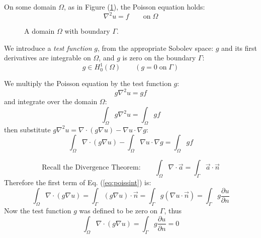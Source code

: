 \documentclass[12pt, a4paper, twoside, openright]{book}
\begin{document}
\vspace{2em}

On some domain $\Omega$, as in Figure (\ref{domain}), the Poisson equation holds:
\begin{equation}
\nabla^2 u = f \qquad \text{on} \; \Omega
\end{equation}

\vspace{1em}
\begin{figure}[ht]
\centering
{}
\caption{A domain $\Omega$ with boundary $\Gamma$.}\label{domain}
\end{figure}

\clearpage
We introduce a \emph{test function} $g$, from the appropriate Sobolev space:  $g$ and its first derivatives are integrable on $\Omega$, and $g$ is zero on the boundary $\Gamma$:
\begin{equation}
g \in H_0^1(\Omega) \qquad (g=0 \; \text{on} \; \Gamma)
\end{equation}

We multiply the Poisson equation by the test function $g$:
\begin{equation}
g \nabla^2 u = g f
\end{equation}
and integrate over the domain $\Omega$:
\begin{equation}
\int_{\Omega} g \nabla^2 u = \int_{\Omega} g f
\end{equation}
then substitute $g \nabla^2 u = \nabla \cdot (g \nabla u) - \nabla u \cdot \nabla g$:
\begin{equation}
\int_{\Omega} \nabla \cdot (g \nabla u) - \int_{\Omega} \nabla u \cdot \nabla g  
= \int_{\Omega} g f
\label{eq:poissint}
\end{equation}

\begin{equation}
\text{Recall the Divergence Theorem:} \qquad
\int_{\Omega} \nabla \cdot \vec{a}  = \int_{\Gamma} \vec{a} \cdot \vec{n}
\end{equation}
Therefore the first term of Eq. (\ref{eq:poissint}) is:
\begin{equation}
\int_{\Omega} \nabla \cdot (g \nabla u) = 
\int_{\Gamma} (g \nabla u) \cdot \vec{n} = \int_{\Gamma} g (\nabla u \cdot \vec{n})
= \int_{\Gamma} g \frac{\partial u}{\partial n}
\end{equation}
Now the test function $g$ was defined to be zero on $\Gamma$, thus
\begin{equation}
\int_{\Omega} \nabla \cdot (g \nabla u)
 = \int_{\Gamma} g \frac{\partial u}{\partial n} =0
\end{equation}
\end{document}
